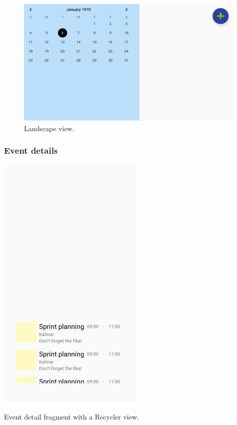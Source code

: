 \documentclass[]{article}
\begin{document}
\begin{flushleft}
\begin{figure}[H]
	\includegraphics[scale=0.7]{img/landscape.png}
	\caption{Landscape view.}
	\label{fig:design_landscape}
\end{figure}


\newpage


\left\subsubsection{Event details}



\begin{floatingfigure}[r]{0.3\linewidth}
	\includegraphics[scale=0.7]{img/recycler_view.png}
	\caption{Event detail fragment with a Recycler view.}
	\label{fig:recycler_view}
	\vspace{\dimexpr0.3\baselineskip-\topskip}
\end{floatingfigure}


\end{flushleft}
\end{document}
